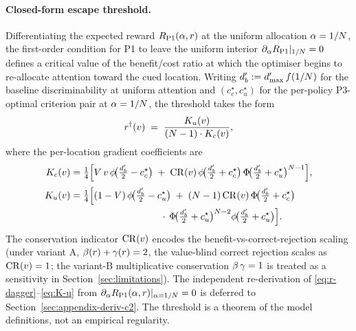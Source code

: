 \paragraph{Closed-form escape threshold.}
Differentiating the expected reward $R_{\mathrm{P1}}(\alpha, r)$ at the
uniform allocation $\alpha = 1/N$, the first-order condition for
P1 to leave the uniform interior $\partial_\alpha R_{\mathrm{P1}}|_{1/N} =
0$ defines a critical value of the benefit/cost ratio at which the
optimiser begins to re-allocate attention toward the cued location.
Writing $d'_b := d'_{\max}\, f(1/N)$ for the baseline
discriminability at uniform attention and $(c_c^\star, c_u^\star)$
for the per-policy P3-optimal criterion pair at $\alpha = 1/N$,
the threshold takes the form
%
\begin{equation}
  r^{\dagger}(v) \;=\; \frac{K_u(v)}{(N - 1) \cdot K_c(v)},
  \label{eq:r-dagger}
\end{equation}
%
where the per-location gradient coefficients are
%
\begin{align}
  K_c(v) &= \tfrac{1}{4}\Big[
    V\, v\, \phi\!\big(\tfrac{d'_b}{2} - c_c^\star\big)
    \;+\; \mathrm{CR}(v)\, \phi\!\big(\tfrac{d'_b}{2} + c_c^\star\big)\,
    \Phi\!\big(\tfrac{d'_b}{2} + c_u^\star\big)^{N - 1}
  \Big],
  \label{eq:K-c}
  \\[2pt]
  K_u(v) &= \tfrac{1}{4}\Big[
    (1 - V)\, \phi\!\big(\tfrac{d'_b}{2} - c_u^\star\big)
    \;+\; (N - 1)\, \mathrm{CR}(v)\, \Phi\!\big(\tfrac{d'_b}{2}
    + c_c^\star\big)
    \notag\\
    &\qquad\quad\;\;\;\;\;\;\;\;\;\;\;\;\;\;\;\;\;\;\;\;\;\;\;
    \cdot\, \Phi\!\big(\tfrac{d'_b}{2} + c_u^\star\big)^{N - 2}
    \phi\!\big(\tfrac{d'_b}{2} + c_u^\star\big)
  \Big].
  \label{eq:K-u}
\end{align}
%
The conservation indicator $\mathrm{CR}(v)$ encodes the
benefit-vs-correct-rejection scaling (under variant A,
$\beta(r) + \gamma(r) = 2$, the value-blind correct
rejection scales as $\mathrm{CR}(v) = 1$; the variant-B multiplicative
conservation $\beta\,\gamma = 1$ is treated as a sensitivity in
Section~\ref{sec:limitations}). The independent re-derivation of
\eqref{eq:r-dagger}--\eqref{eq:K-u} from
$\partial_\alpha R_{\mathrm{P1}}(\alpha, r) |_{\alpha = 1/N} = 0$ is
deferred to Section~\ref{sec:appendix-deriv-c2}. The threshold is a
theorem of the model definitions, not an empirical regularity.

